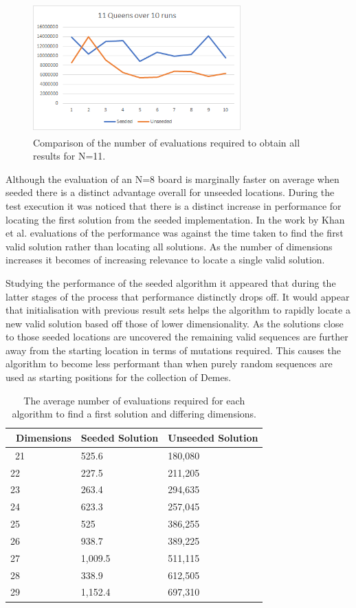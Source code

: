 \documentclass[conference]{IEEEtran}
\begin{document}
\begin{figure}[!htbp]
	\centering	
	\includegraphics[width=8cm, height=5cm]{11QueensAllValues}
		\caption{Comparison of the number of evaluations required to obtain all results for N=11.}
\end{figure}

Although the evaluation of an N=8 board is marginally faster on average when seeded there is a distinct advantage overall for unseeded locations. During the test execution it was noticed that there is a distinct increase in performance for locating the first solution from the seeded implementation. In the work by Khan et al. \cite{ACO} evaluations of the performance was against the time taken to find the first valid solution rather than locating all solutions. As the number of dimensions increases it becomes of increasing relevance to locate a single valid solution.

Studying the performance of the seeded algorithm it appeared that during the latter stages of the process that performance distinctly drops off.  It would appear that initialisation with previous result sets helps the algorithm to rapidly locate a new valid solution based off those of lower dimensionality. As the solutions close to those seeded locations are uncovered the remaining valid sequences are further away from the starting location in terms of mutations required. This causes the algorithm to become less performant than when purely random sequences are used as starting positions for the collection of Demes.

\begin{table}[ht]
	\begin{tabular}{|p{2cm}|p{6cm}|p{6cm}|} 
		\hline\
		Dimensions & Seeded Solution & Unseeded Solution \\
		\hline\
		21 & 525.6 & 180,080 \\
		22 & 227.5 & 211,205 \\
		23 & 263.4 & 294,635 \\
		24 & 623.3 & 257,045 \\
		25 & 525 & 386,255 \\
		26 & 938.7 & 389,225 \\
		27 & 1,009.5 & 511,115 \\
		28 & 338.9 & 612,505 \\
		29 & 1,152.4 & 697,310 \\		
		\hline
	\end{tabular}
	\caption{The average number of evaluations required for each algorithm to find a first solution and differing dimensions.}
\end{table}
\end{document}
